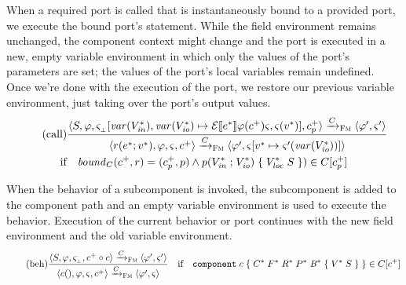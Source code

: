 \documentclass[a4paper,10pt,english]{article}
\begin{document}
When a required port is called that is instantaneously bound to a provided port, we execute the bound port's statement.
While the field environment remains unchanged, the component context might change and the port is executed in a new, empty
variable environment in which only the values of the port's parameters are set; the values of the port's local variables remain undefined. Once we're
done with the execution of the port, we restore our previous variable environment, just taking over the port's output values.
\begin{multline*}
	\tag{call${}$}
	\dfrac
	{
		\configurationFm{\stmFm, \fieldEnv, \varEnvFmEmpty[\varof(\toList{\varDecl}_\mathit{in}), \varof(\toList{\varDecl}_\mathit{io}) \mapsto
		\ExprSem{\toList{\expr}}\fieldEnv(\toListNE{\comp})\varEnvFm, \varEnvFm(\toList{\var})],
		\toListNE{\comp}_\provPort}
			\stmArrowFm
		\configurationFm{\fieldEnv', \varEnvFm'}
	}
	{
		\configurationFm{\invokePort{\reqPort}{\toList{\expr}}{\toList{\var}}, \fieldEnv, \varEnvFm, \toListNE{\comp}}
			\stmArrowFm
		\configurationFm{\fieldEnv', \varEnvFm[\toList{\var} \mapsto \varEnvFm'(\varof(\toList{\varDecl_\mathit{io}}))]}
	}
	\\ \text{if} \quad \boundof_\compDecl(\toListNE{\comp},
	\reqPort) = (\toListNE{\comp}_\provPort, \provPort) \wedge
	\provPortDeclSyn{\provPort}{\toList{\varDecl_\mathit{in}}}{\toList{\varDecl_\mathit{io}}}{\toList{\varDecl_\mathit{loc}}}{\stmFm})
	\in \compDecl[\toListNE{\comp}_\provPort]
\end{multline*}

When the behavior of a subcomponent is invoked, the subcomponent is added to the component path and an empty variable environment
is used to execute the behavior. Execution of the current behavior or port continues with the new field environment and the old
variable environment.
\begin{equation*}
	\tag{beh}
	\dfrac
	{
		\langle S, \varphi, \varsigma_{{}_\bot}, c^+
		\circ c \rangle
			\xrightarrow{C}_\textsc{Fm}
		\langle \varphi', \varsigma' \rangle
	}
	{
		\langle c (), \varphi, \varsigma, c^+ \rangle
			\xrightarrow{C}_\textsc{Fm}
		\langle \varphi', \varsigma \rangle
	}
	\quad \text{if} \quad
	\texttt{component} \; c \; \mathtt{\{} \; C^* \; F^* \; R^* \; P^* \; \mathit{B}^* \; \mathtt{\{} \; V^* \; S \; \mathtt{\}} \; \mathtt{\}}
	\in C[c^+]
\end{equation*}
\end{document}
